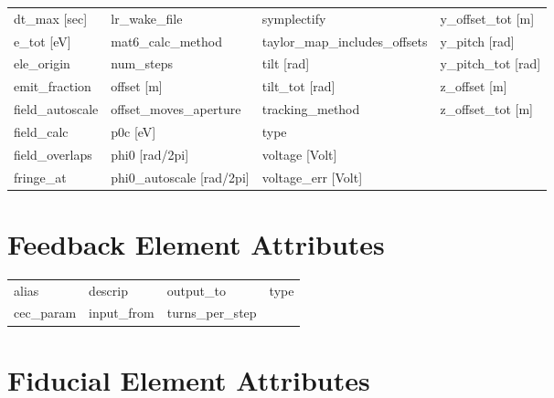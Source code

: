 \begin{tabular}{llll}
dt_max [sec]                     & lr_wake_file                     & symplectify                      & y_offset_tot [m]                 \\
e_tot [eV]                       & mat6_calc_method                 & taylor_map_includes_offsets      & y_pitch [rad]                    \\
ele_origin                       & num_steps                        & tilt [rad]                       & y_pitch_tot [rad]                \\
emit_fraction                    & offset [m]                       & tilt_tot [rad]                   & z_offset [m]                     \\
field_autoscale                  & offset_moves_aperture            & tracking_method                  & z_offset_tot [m]                 \\
field_calc                       & p0c [eV]                         & type                             &                                  \\
field_overlaps                   & phi0 [rad/2pi]                   & voltage [Volt]                   &                                  \\
fringe_at                        & phi0_autoscale [rad/2pi]         & voltage_err [Volt]               &                                  \\
 \bottomrule
 \end{tabular}
 \vfill
 
 \section{Feedback Element Attributes}
 \label{s:list.feedback}
 
 \begin{tabular}{llll} \toprule
alias                            & descrip                          & output_to                        & type                             \\
cec_param                        & input_from                       & turns_per_step                   &                                  \\
 \bottomrule
 \end{tabular}
 \vfill
 
 \section{Fiducial Element Attributes}
 \label{s:list.fiducial}
 
